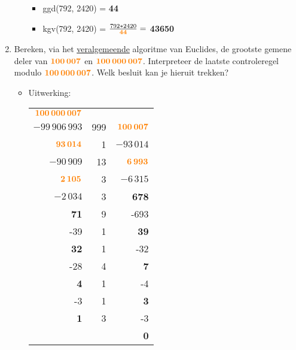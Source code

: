 \documentclass[12pt]{report}
\newcommand{\important}[1] {\textbf{\color{orange}#1}}
\begin{document}
\begin{enumerate}
\begin{enumerate}
\begin{itemize}[label={}]
	      	      	\item ggd(792, 2420) = \important{44}
	      	      	\item kgv(792, 2420) = $\frac{792 * 2420}{\important{44}} = $ \important{43650}
	      	      \end{itemize}
	      	      	      	      
	      	      	      	      
	      	      	      	        
	      \end{enumerate}
	\item Bereken, via het \underline{veralgemeende} algoritme van Euclides, 
	      de grootste gemene deler van $\important{100\,007}$ en $\important{100\,000\,007}$. Interpreteer de laatste controleregel modulo
	      $\important{100\,000\,007}$. Welk besluit kan je hieruit trekken?
	      \begin{itemize}[label={}]
	      	\item Uitwerking: \newline   
	      	\begin{tabular}{r|r|r}
	      	      $\important{100\,000\,007}$  & & \\
	      	      $-99\,906\,993$ & 999 & $\important{100\,007}$ \\
	      	      $\important{93\,014}$ & 1 & $-93\,014$ \\
	      	      $-90\,909$ & 13 & $\important{6\,993}$ \\
	      	      $\important{2\,105}$ & 3 & $-6\,315$  \\
	      	      $-2\,034$ & 3 & \important{678} \\
	      	      \important{71} & 9 & -693 \\
	      	      -39 & 1 & \important{39} \\
	      	      \important{32} & 1 & -32 \\
	      	     -28 & 4 & \important{7} \\
	      	      \important{4} & 1 & -4 \\
	      	      -3 & 1 & \important{3} \\ 
	      	      \important{1} & 3 & -3 \\
	      	       & & \important{0}
	      
	      	      
	      	\end{tabular}
	      		     

\end{itemize}
\end{enumerate}
\end{document}

